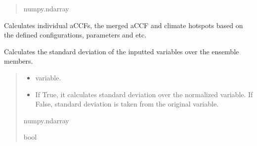\documentclass[a4paper,11pt,english]{sphinxmanual}
\begin{document}
\begin{fulllineitems}
\begin{fulllineitems}
\begin{quote}
\begin{description}
\sphinxAtStartPar
numpy.ndarray

\end{description}\end{quote}

\end{fulllineitems}


\begin{fulllineitems}
\label{\detokenize{modules:envlib.accf.GeTaCCFs.get_accfs}}
\pysigstartsignatures
{}
\pysigstopsignatures
\sphinxAtStartPar
Calculates individual aCCFs, the merged aCCF and climate hotspots based on the defined configurations, parameters and etc.

\end{fulllineitems}


\begin{fulllineitems}
\label{\detokenize{modules:envlib.accf.GeTaCCFs.get_std}}
\pysigstartsignatures
{}
\pysigstopsignatures
\sphinxAtStartPar
Calculates the standard deviation of the inputted variables over the ensemble members.
\begin{quote}\begin{description}
\begin{itemize}
\item {} 
\sphinxAtStartPar
{} \textendash{} variable.

\item {} 
\sphinxAtStartPar
{} \textendash{} If True, it calculates standard deviation over the normalized variable. If False, standard deviation is taken from the original variable.

\end{itemize}

\sphinxAtStartPar
numpy.ndarray

\sphinxAtStartPar
bool


\end{description}
\end{quote}
\end{fulllineitems}
\end{fulllineitems}
\end{document}
